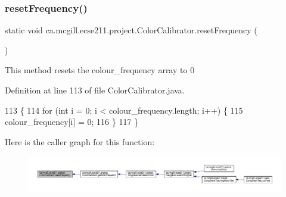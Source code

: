 \mbox{\label{classca_1_1mcgill_1_1ecse211_1_1project_1_1_color_calibrator_ab6148d75e3a105016580e90ed1ea9bc9}} 
\subsubsection{\texorpdfstring{reset\+Frequency()}{resetFrequency()}}
{\footnotesize\ttfamily static void ca.\+mcgill.\+ecse211.\+project.\+Color\+Calibrator.\+reset\+Frequency (\begin{DoxyParamCaption}{ }\end{DoxyParamCaption})\hspace{0.3cm}{\ttfamily [static]}}

This method resets the colour\+\_\+frequency array to 0 

Definition at line 113 of file Color\+Calibrator.\+java.


\begin{DoxyCode}
113                                       \{
114     \textcolor{keywordflow}{for} (\textcolor{keywordtype}{int} i = 0; i < colour\_frequency.length; i++) \{
115       colour\_frequency[i] = 0;
116     \}
117   \}
\end{DoxyCode}
Here is the caller graph for this function\+:
\nopagebreak
\begin{figure}[H]
\begin{center}
\leavevmode
\includegraphics[width=350pt]{classca_1_1mcgill_1_1ecse211_1_1project_1_1_color_calibrator_ab6148d75e3a105016580e90ed1ea9bc9_icgraph}
\end{center}
\end{figure}
\mbox{\label{classca_1_1mcgill_1_1ecse211_1_1project_1_1_color_calibrator_a40906193773ead0bfd582f188413c97a}} 
